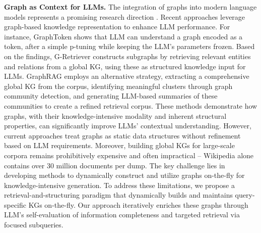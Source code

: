 \textbf{Graph as Context for LLMs.}
The integration of graphs into modern language models represents a promising research direction \cite{yasunaga2021qa,yasunaga2022deep,yu2022retrieval, ju2022grape, zhu2024realm,gutierrez2024hipporag}. Recent approaches leverage graph-based knowledge representation to enhance LLM performance. For instance, GraphToken \cite{perozzi2024let} shows that LLM can understand a graph encoded as a token, after a simple p-tuning \cite{liu2021p} while keeping the LLM's parameters frozen. Based on the findings, G-Retriever \cite{he2024gretriever} constructs subgraphs by retrieving relevant entities and relations from a global KG, using these as structured knowledge input for LLMs. 
GraphRAG \cite{edge2024local} employs an alternative strategy, extracting a comprehensive global KG from the corpus, identifying meaningful clusters through graph community detection, and generating LLM-based summaries of these communities to create a refined retrieval corpus. 
These methods demonstrate how graphs, with their knowledge-intensive modality and inherent structural properties, can significantly improve LLMs' contextual understanding. However, current approaches treat graphs as static data structures without refinement based on LLM requirements. Moreover, building global KGs for large-scale corpora remains prohibitively expensive and often impractical -- Wikipedia alone contains over 30 million documents per dump. The key challenge lies in developing methods to dynamically construct and utilize graphs on-the-fly for knowledge-intensive generation.
To address these limitations, we propose a retrieval-and-structuring paradigm that dynamically builds and maintains query-specific KGs on-the-fly. Our approach iteratively enriches these graphs through LLM's self-evaluation of information completeness and targeted retrieval via focused subqueries.